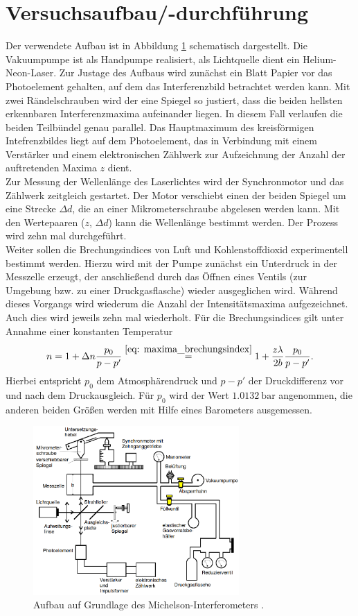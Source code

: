 \section{Versuchsaufbau/-durchführung}
Der verwendete Aufbau ist in Abbildung \ref{fig: aufbau} schematisch dargestellt. Die Vakuumpumpe ist als Handpumpe
realisiert, als Lichtquelle dient ein Helium-Neon-Laser. Zur Justage des Aufbaus wird zunächst ein Blatt Papier vor das Photoelement gehalten,
auf dem das Interferenzbild betrachtet werden kann. Mit zwei Rändelschrauben wird der eine Spiegel so justiert,
dass die beiden hellsten erkennbaren Interferenzmaxima
aufeinander liegen. In diesem Fall verlaufen die beiden Teilbündel genau parallel. Das Hauptmaximum des kreisförmigen Intefrenzbildes
liegt auf dem Photoelement, das in Verbindung mit einem Verstärker und einem elektronischen Zählwerk zur Aufzeichnung der Anzahl
der auftretenden Maxima $z$ dient.\\
Zur Messung der Wellenlänge des Laserlichtes wird der Synchronmotor und das Zählwerk zeitgleich gestartet. Der Motor verschiebt einen
der beiden Spiegel um eine Strecke $\Delta d$, die an einer Mikrometerschraube abgelesen werden kann. Mit den Wertepaaren ($z$, $\Delta d$) kann
die Wellenlänge bestimmt werden. Der Prozess wird zehn mal durchgeführt. \\
Weiter sollen die Brechungsindices von Luft und Kohlenstoffdioxid experimentell bestimmt werden. Hierzu  wird mit der Pumpe zunächst ein Unterdruck
in der Messzelle erzeugt, der anschließend
durch das Öffnen eines Ventils (zur Umgebung bzw. zu einer Druckgasflasche) wieder ausgeglichen wird. Während dieses Vorgangs wird wiederum die
Anzahl der Intensitätsmaxima aufgezeichnet. Auch dies wird jeweils zehn mal wiederholt. Für die Brechungsindices gilt unter Annahme einer konstanten
Temperatur
\begin{equation}
  \label{eq: brechungsindex}
  n = 1 + \Delta n \frac{p_0}{p - p'} \overset{\eqref{eq: maxima_brechungsindex}}{=} 1 + \frac{z \lambda}{2b} \frac{p_0}{p - p'} .
\end{equation}
Hierbei entspricht $p_0$ dem Atmosphärendruck und $p - p'$ der Druckdifferenz vor und nach dem Druckausgleich. Für $p_0$ wird der Wert $\SI{1.0132}{\bar}$ angenommen,
die anderen beiden Größen werden mit Hilfe eines Barometers ausgemessen.
\begin{figure}
  \centering
  \includegraphics[width = 0.7\textwidth]{table/aufbau.png}
  \caption{Aufbau auf Grundlage des Michelson-Interferometers \cite{anleitung401}.}
  \label{fig: aufbau}
\end{figure}
